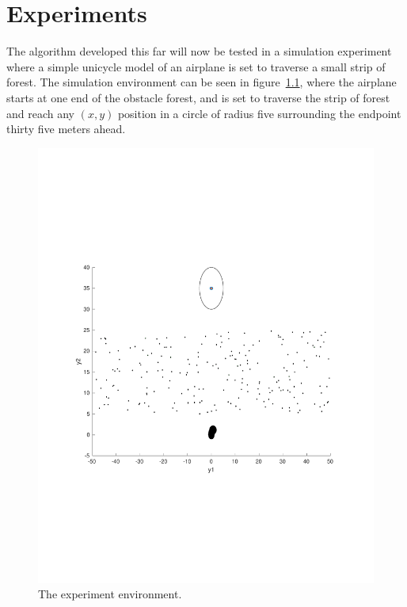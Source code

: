 \chapter{Experiments}
\label{chp:experiments}

The \rrtfunnel{} algorithm developed this far will now be tested in a simulation
experiment where a simple unicycle model of an airplane is set to traverse a
small strip of forest. The simulation environment can be seen in
figure~\cref{fig:simulated-forest}, where the airplane starts at one end of the
obstacle forest, and is set to traverse the strip of forest and reach any
\((x,y)\) position in a circle of radius five surrounding the endpoint thirty
five meters ahead.

\begin{figure}
  \centering \includegraphics[scale=.5, trim={0cm 6cm 0cm
    6cm}]{figures/experiments/simulated-forest} \caption{The experiment
    environment.}
  \label{fig:simulated-forest}
\end{figure}

